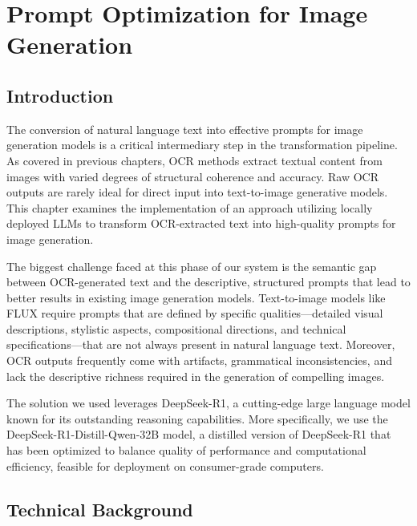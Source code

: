 

\chapter{Prompt Optimization for Image Generation}
\label{chap:prompt-optimization}

\section{Introduction}
\label{sec:prompt-introduction}

The conversion of natural language text into effective prompts for image generation models is a critical intermediary step in the transformation pipeline. As covered in previous chapters, OCR methods extract textual content from images with varied degrees of structural coherence and accuracy. Raw OCR outputs are rarely ideal for direct input into text-to-image generative models. This chapter examines the implementation of an approach utilizing locally deployed LLMs to transform OCR-extracted text into high-quality prompts for image generation.

The biggest challenge faced at this phase of our system is the semantic gap between OCR-generated text and the descriptive, structured prompts that lead to better results in existing image generation models. Text-to-image models like FLUX require prompts that are defined by specific qualities—detailed visual descriptions, stylistic aspects, compositional directions, and technical specifications—that are not always present in natural language text. Moreover, OCR outputs frequently come with artifacts, grammatical inconsistencies, and lack the descriptive richness required in the generation of compelling images.

The solution we used leverages DeepSeek-R1, a cutting-edge large language model known for its outstanding reasoning capabilities. More specifically, we use the DeepSeek-R1-Distill-Qwen-32B model, a distilled version of DeepSeek-R1 that has been optimized to balance quality of performance and computational efficiency, feasible for deployment on consumer-grade computers.

\section{Technical Background}
\label{sec:prompt-background}

